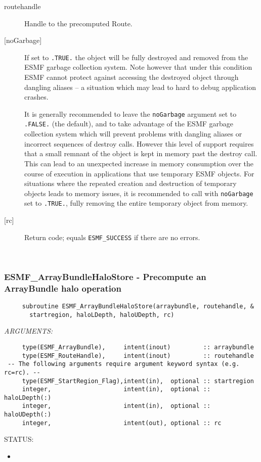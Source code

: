      \begin{description}
     \item [routehandle]
       Handle to the precomputed Route.
     \item[{[noGarbage]}]
       If set to {\tt .TRUE.} the object will be fully destroyed and removed
       from the ESMF garbage collection system. Note however that under this 
       condition ESMF cannot protect against accessing the destroyed object 
       through dangling aliases -- a situation which may lead to hard to debug 
       application crashes.
   
       It is generally recommended to leave the {\tt noGarbage} argument
       set to {\tt .FALSE.} (the default), and to take advantage of the ESMF 
       garbage collection system which will prevent problems with dangling
       aliases or incorrect sequences of destroy calls. However this level of
       support requires that a small remnant of the object is kept in memory
       past the destroy call. This can lead to an unexpected increase in memory
       consumption over the course of execution in applications that use 
       temporary ESMF objects. For situations where the repeated creation and 
       destruction of temporary objects leads to memory issues, it is 
       recommended to call with {\tt noGarbage} set to {\tt .TRUE.}, fully 
       removing the entire temporary object from memory.
     \item [{[rc]}]
       Return code; equals {\tt ESMF\_SUCCESS} if there are no errors.
     \end{description}
   
 
\mbox{}\hrulefill\ 
 
\subsubsection [ESMF\_ArrayBundleHaloStore] {ESMF\_ArrayBundleHaloStore - Precompute an ArrayBundle halo operation}


  
\begin{verbatim}     subroutine ESMF_ArrayBundleHaloStore(arraybundle, routehandle, &
       startregion, haloLDepth, haloUDepth, rc)\end{verbatim}{\em ARGUMENTS:}
\begin{verbatim}     type(ESMF_ArrayBundle),     intent(inout)         :: arraybundle
     type(ESMF_RouteHandle),     intent(inout)         :: routehandle
 -- The following arguments require argument keyword syntax (e.g. rc=rc). --
     type(ESMF_StartRegion_Flag),intent(in),  optional :: startregion
     integer,                    intent(in),  optional :: haloLDepth(:)
     integer,                    intent(in),  optional :: haloUDepth(:)
     integer,                    intent(out), optional :: rc\end{verbatim}
{\sf STATUS:}
   \begin{itemize}
   \item{}
   \end{itemize}
  
